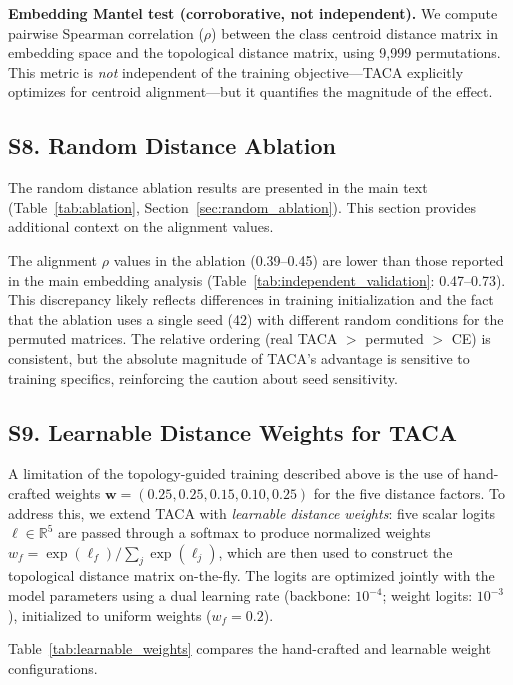 \documentclass[preprint,review,12pt]{elsarticle}
\begin{document}
\textbf{Embedding Mantel test (corroborative, not independent).} We compute pairwise Spearman correlation ($\rho$) between the class centroid distance matrix in embedding space and the topological distance matrix, using 9{,}999 permutations. This metric is \emph{not} independent of the training objective---TACA explicitly optimizes for centroid alignment---but it quantifies the magnitude of the effect.

\subsection*{S8. Random Distance Ablation}\label{sec:supp_ablation}

The random distance ablation results are presented in the main text (Table~\ref{tab:ablation}, Section~\ref{sec:random_ablation}). This section provides additional context on the alignment values.

The alignment $\rho$ values in the ablation (0.39--0.45) are lower than those reported in the main embedding analysis (Table~\ref{tab:independent_validation}: 0.47--0.73). This discrepancy likely reflects differences in training initialization and the fact that the ablation uses a single seed (42) with different random conditions for the permuted matrices. The relative ordering (real TACA $>$ permuted $>$ CE) is consistent, but the absolute magnitude of TACA's advantage is sensitive to training specifics, reinforcing the caution about seed sensitivity.

\subsection*{S9. Learnable Distance Weights for TACA}\label{sec:supp_learnable}

A limitation of the topology-guided training described above is the use of hand-crafted weights $\mathbf{w} = (0.25, 0.25, 0.15, 0.10, 0.25)$ for the five distance factors. To address this, we extend TACA with \emph{learnable distance weights}: five scalar logits $\boldsymbol{\ell} \in \mathbb{R}^5$ are passed through a softmax to produce normalized weights $w_f = \exp(\ell_f) / \sum_j \exp(\ell_j)$, which are then used to construct the topological distance matrix on-the-fly. The logits are optimized jointly with the model parameters using a dual learning rate (backbone: $10^{-4}$; weight logits: $10^{-3}$), initialized to uniform weights ($w_f = 0.2$).

Table~\ref{tab:learnable_weights} compares the hand-crafted and learnable weight configurations.
\end{document}
